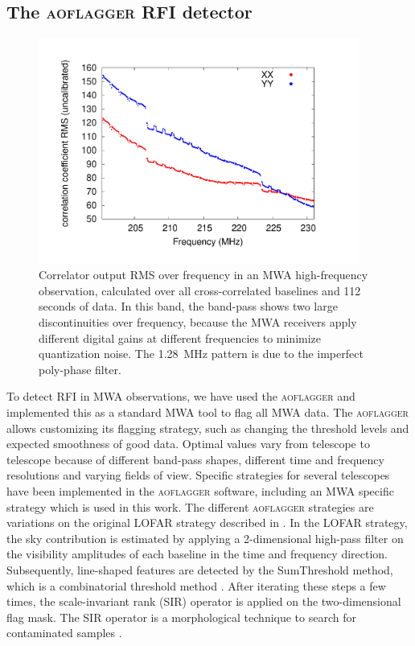 \documentclass{pasa}
\begin{document}
\subsection{The \textsc{aoflagger} RFI detector}

\begin{figure}
\begin{center}\hspace*{-0.8cm}\includegraphics[width=10.5cm]{img/bandpass}
\caption{Correlator output RMS over frequency in an MWA high-frequency observation, calculated over all cross-correlated baselines and 112 seconds of data. In this band, the band-pass shows two large discontinuities over frequency, because the MWA receivers apply different digital gains at different frequencies to minimize quantization noise. The 1.28~MHz pattern is due to the imperfect poly-phase filter.
}
\label{fig:bandpass}
\end{center}
\end{figure}

To detect RFI in MWA observations, we have used the \textsc{aoflagger} and implemented this as a standard MWA tool to flag all MWA data. The \textsc{aoflagger} allows customizing its flagging strategy, such as changing the threshold levels and expected smoothness of good data. Optimal values vary from telescope to telescope because of different band-pass shapes, different time and frequency resolutions and varying fields of view. Specific strategies for several telescopes have been implemented in the \textsc{aoflagger} software, including an MWA specific strategy which is used in this work. The different \textsc{aoflagger} strategies are variations on the original LOFAR strategy described in . In the LOFAR strategy, the sky contribution is estimated by applying a 2-dimensional high-pass filter on the visibility amplitudes of each baseline in the time and frequency direction. Subsequently, line-shaped features are detected by the SumThreshold method, which is a combinatorial threshold method \citep{post-correlation-rfi-classification}. After iterating these steps a few times, the scale-invariant rank (SIR) operator is applied on the two-dimensional flag mask. The SIR operator is a morphological technique to search for contaminated samples \citep{scale-invariant-rank-operator}.
\end{document}
